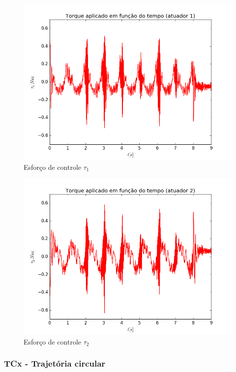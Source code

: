 \documentclass[]{politex}
\begin{document}
\begin{multicols}{2}
\begin{figure}[H]
	\centering
	\includegraphics[scale=0.39]{../../../Experimental/Aquisicoes/PIDSMCx_circulo/tau1.png}  
	\caption{Esforço de controle $\tau_1$}
	\label{fig:PIDSMCx_circulo_tau1}
\end{figure}
\begin{figure}[H]
	\centering
	\includegraphics[scale=0.39]{../../../Experimental/Aquisicoes/PIDSMCx_circulo/tau2.png}  
	\caption{Esforço de controle $\tau_2$}
	\label{fig:PIDSMCx_circulo_tau2}
\end{figure}
\end{multicols}

\subsubsection{TCx - Trajetória circular}
\end{document}

